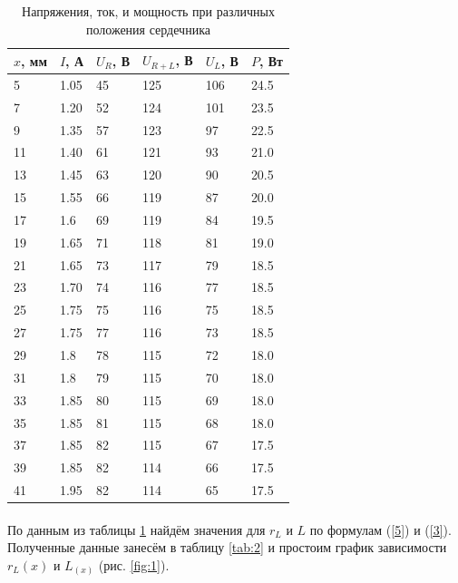 \documentclass[a4paper,12pt]{article} %
\begin{document}
\begin{table}[h]
\begin{center}
\centering
\begin{tabular}{|l|l|l|l|l|l|}
\hline
\multicolumn{1}{|c|}{$x$, мм} & \multicolumn{1}{c|}{$I$, А} & \multicolumn{1}{c|}{$U_R$, В} & \multicolumn{1}{c|}{$U_{R+L}$, В} & \multicolumn{1}{c|}{$U_L$, В} & \multicolumn{1}{c|}{$P$, Вт} \\ \hline
5 & 1.05 & 45 & 125 & 106 & 24.5 \\ \hline
7 & 1.20 & 52 & 124 & 101 & 23.5 \\ \hline
9 & 1.35 & 57 & 123 & 97 & 22.5 \\ \hline
11 & 1.40 & 61 & 121 & 93 & 21.0 \\ \hline
13 & 1.45 & 63 & 120 & 90 & 20.5 \\ \hline
15 & 1.55 & 66 & 119 & 87 & 20.0 \\ \hline
17 & 1.6 & 69 & 119 & 84 & 19.5 \\ \hline
19 & 1.65 & 71 & 118 & 81 & 19.0 \\ \hline
21 & 1.65 & 73 & 117 & 79 & 18.5 \\ \hline
23 & 1.70 & 74 & 116 & 77 & 18.5 \\ \hline
25 & 1.75 & 75 & 116 & 75 & 18.5 \\ \hline
27 & 1.75 & 77 & 116 & 73 & 18.5 \\ \hline
29 & 1.8 & 78 & 115 & 72 & 18.0 \\ \hline
31 & 1.8 & 79 & 115 & 70 & 18.0 \\ \hline
33 & 1.85 & 80 & 115 & 69 & 18.0 \\ \hline
35 & 1.85 & 81 & 115 & 68 & 18.0 \\ \hline
37 & 1.85 & 82 & 115 & 67 & 17.5 \\ \hline
39 & 1.85 & 82 & 114 & 66 & 17.5 \\ \hline
41 & 1.95 & 82 & 114 & 65 & 17.5 \\ \hline
\end{tabular}
\caption{Напряжения, ток, и мощность при различных положения сердечника}
\label{tab:1}
\end{center}
\end{table}

\paragraph{} По данным из таблицы \ref{tab:1} найдём значения для $r_L$ и $L$ по формулам (\ref{5}) и (\ref{3}). Полученные данные занесём в таблицу \ref{tab:2} и простоим график зависимости $r_L(x)$ и $L_(x)$ (рис. \ref{fig:1}).
\end{document}
